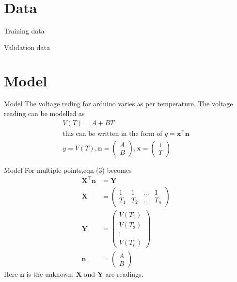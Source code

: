 \documentclass{beamer}
\providecommand{\brak}[1]{\ensuremath{\left(#1\right)}}
\theoremstyle{remark}
\newcommand{\myvec}[1]{\ensuremath{\begin{pmatrix}#1\end{pmatrix}}}
\renewcommand{\vec}[1]{\mathbf{\boldsymbol{#1}}}
\begin{document}
\section{Data}
\begin{frame}{Training data}
    \begin{table}[ht!]
        
        \label{tab:Training data}
    \end{table}
\end{frame}

\begin{frame}{Validation data}
    \begin{table}[!ht]
        \centering
        
        \label{tab:Validation data}
    \end{table}
\end{frame}

\section{Model}
\begin{frame}{Model}
    The voltage reding for arduino varies as per temperature. The voltage reading can be modelled as
    \begin{align}
        V(T)       =  A + BT \\
        \text{this can be written in the form of } y  = \vec{x}^\top\vec{n}  \\
        y = V(T), \vec{n} = \myvec{A\\B}, \vec{x} = \myvec{1\\T}
    \end{align}
\end{frame}

\begin{frame}{Model}
    For multiple points,eqn (3) becomes
    \begin{align}
        \vec{X}^\top\vec{n} &= \vec{Y}                   \\
        \vec{X} & = \myvec{1           & 1 & \ldots & 1 \\T_1&T_2&\ldots&T_n} \\
        \vec{Y} & = \myvec{V\brak{T_1}                  \\V\brak{T_2}\\\vdots\\V\brak{T_n}}\\
        \vec{n} &= \myvec{A\\B}
    \end{align}
    Here $\vec{n}$ is the unknown, $\vec{X}$ and $\vec{Y}$ are readings.
\end{frame}
\end{document}
